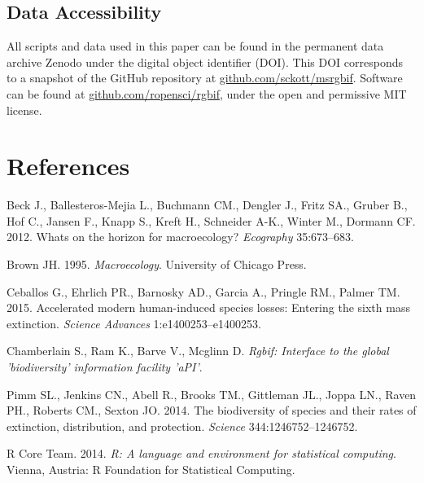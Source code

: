\documentclass[author-year, review, 11pt]{components/elsarticle} %
\begin{document}
\subsection{Data Accessibility}\label{data-accessibility}

All scripts and data used in this paper can be found in the permanent
data archive Zenodo under the digital object identifier (DOI). This DOI
corresponds to a snapshot of the GitHub repository at
\href{https://github.com/sckott/msrgbif}{github.com/sckott/msrgbif}.
Software can be found at
\href{https://github.com/ropensci/rgbif}{github.com/ropensci/rgbif},
under the open and permissive MIT license.

\section*{References}\label{references}

Beck J., Ballesteros-Mejia L., Buchmann CM., Dengler J., Fritz SA.,
Gruber B., Hof C., Jansen F., Knapp S., Kreft H., Schneider A-K., Winter
M., Dormann CF. 2012. Whats on the horizon for macroecology?
\emph{Ecography} 35:673--683.

Brown JH. 1995. \emph{Macroecology}. University of Chicago Press.

Ceballos G., Ehrlich PR., Barnosky AD., Garcia A., Pringle RM., Palmer
TM. 2015. Accelerated modern human-induced species losses: Entering the
sixth mass extinction. \emph{Science Advances} 1:e1400253--e1400253.

Chamberlain S., Ram K., Barve V., Mcglinn D. \emph{Rgbif: Interface to
the global 'biodiversity' information facility 'aPI'}.

Pimm SL., Jenkins CN., Abell R., Brooks TM., Gittleman JL., Joppa LN.,
Raven PH., Roberts CM., Sexton JO. 2014. The biodiversity of species and
their rates of extinction, distribution, and protection. \emph{Science}
344:1246752--1246752.

R Core Team. 2014. \emph{R: A language and environment for statistical
computing}. Vienna, Austria: R Foundation for Statistical Computing.
\end{document}
